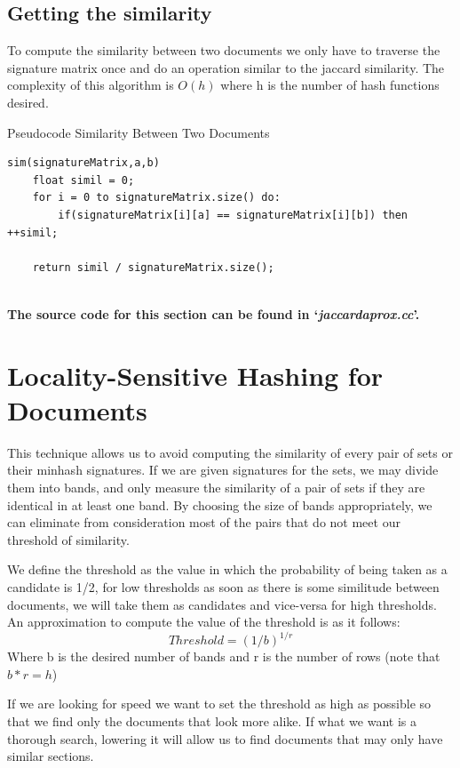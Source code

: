 \documentclass[12pt]{article}
\begin{document}
\subsection{Getting the similarity}
To compute the similarity between two documents we only have to traverse the signature matrix once and do an operation similar to the jaccard similarity. The complexity of this algorithm is $O(h)$ where h is the number of hash functions desired.
\begin{center}
\begin{large}
Pseudocode Similarity Between Two Documents
\end{large}
\end{center}
\begin{lstlisting}
sim(signatureMatrix,a,b)
    float simil = 0;
    for i = 0 to signatureMatrix.size() do:
        if(signatureMatrix[i][a] == signatureMatrix[i][b]) then ++simil;
 
    return simil / signatureMatrix.size();


\end{lstlisting}

\textbf{The source code for this section can be found in `\textit{jaccardaprox.cc}'.}
\bigskip

\section{Locality-Sensitive Hashing for Documents}
 This technique allows us to avoid computing the similarity of every pair of sets or their minhash signatures. If we are given signatures for the sets, we may divide them into bands, and only measure the similarity of a pair of sets if they are identical in at least one band. By choosing the size of bands appropriately, we can eliminate from consideration most of the pairs that do not meet our threshold of similarity.
 
 \bigskip
 We define the threshold as the value in which the probability of being taken as a candidate is 1/2, for low thresholds as soon as there is some similitude between documents, we will take them as candidates and vice-versa for high thresholds. An approximation to compute the value of the threshold is as it follows:
 $$Threshold = (1/b)^{1/r}$$
 Where b is the desired number of bands and r is the number of rows (note that $b*r = h$)
 
 \bigskip
If we are looking for speed we want to set the threshold as high as possible so that we find only the documents that look more alike. If what we want is a thorough search, lowering it will allow us to find documents that may only have similar sections.
\medskip 
 
\end{document}
